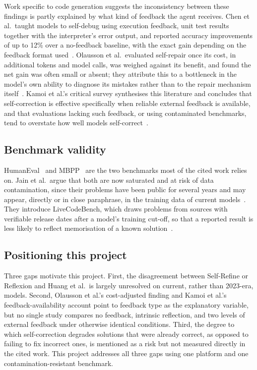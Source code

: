 \documentclass[conference]{IEEEtran}
\begin{document}
Work specific to code generation suggests the inconsistency between these findings is partly explained by what kind of feedback the agent receives. Chen et al.\ taught models to self-debug using execution feedback, unit test results together with the interpreter's error output, and reported accuracy improvements of up to 12\% over a no-feedback baseline, with the exact gain depending on the feedback format used~\cite{chen2024}. Olausson et al.\ evaluated self-repair once its cost, in additional tokens and model calls, was weighed against its benefit, and found the net gain was often small or absent; they attribute this to a bottleneck in the model's own ability to diagnose its mistakes rather than to the repair mechanism itself~\cite{olausson2024}. Kamoi et al.'s critical survey synthesises this literature and concludes that self-correction is effective specifically when reliable external feedback is available, and that evaluations lacking such feedback, or using contaminated benchmarks, tend to overstate how well models self-correct~\cite{kamoi2024}.

\subsection{Benchmark validity}

HumanEval~\cite{chen2021} and MBPP~\cite{austin2021} are the two benchmarks most of the cited work relies on. Jain et al.\ argue that both are now saturated and at risk of data contamination, since their problems have been public for several years and may appear, directly or in close paraphrase, in the training data of current models~\cite{jain2025}. They introduce LiveCodeBench, which draws problems from sources with verifiable release dates after a model's training cut-off, so that a reported result is less likely to reflect memorisation of a known solution~\cite{jain2025}.

\subsection{Positioning this project}

Three gaps motivate this project. First, the disagreement between Self-Refine or Reflexion and Huang et al.\ is largely unresolved on current, rather than 2023-era, models. Second, Olausson et al.'s cost-adjusted finding and Kamoi et al.'s feedback-availability account point to feedback type as the explanatory variable, but no single study compares no feedback, intrinsic reflection, and two levels of external feedback under otherwise identical conditions. Third, the degree to which self-correction degrades solutions that were already correct, as opposed to failing to fix incorrect ones, is mentioned as a risk but not measured directly in the cited work. This project addresses all three gaps using one platform and one contamination-resistant benchmark.
\end{document}
